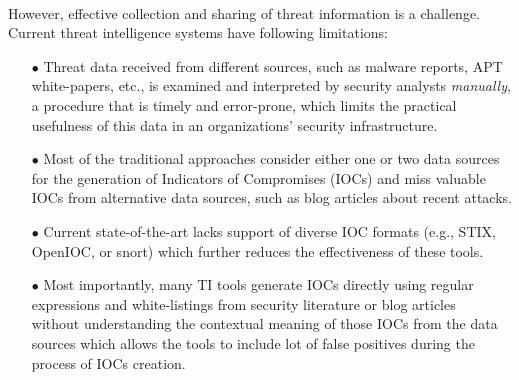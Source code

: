 \paragraph{} %
However, effective collection and sharing of threat information is a challenge. Current threat intelligence systems have following limitations: 
\begin{itemize}
 \item[$\bullet$ ] Threat data received from different sources, such as malware reports, APT white-papers, etc., is examined and interpreted
by security analysts \emph{manually}, a procedure that is timely and error-prone, which limits the practical usefulness of this
data in an organizations' security infrastructure. 
  \item[$\bullet$ ] Most of the traditional approaches consider either one or two data sources for the generation of Indicators of Compromises
(IOCs) and miss valuable IOCs from alternative data sources, such as blog articles about recent attacks.
  \item[$\bullet$ ] Current state-of-the-art lacks support of diverse IOC formats (e.g., STIX, OpenIOC, or snort) which further reduces the effectiveness of these tools. 
\item[$\bullet$ ] Most importantly, many TI tools generate IOCs directly using regular expressions and white-listings from security literature or blog articles~\cite{otx} without understanding the contextual meaning of those IOCs from the data sources which allows the tools to include lot of false positives during the process of IOCs creation.
\end{itemize}


